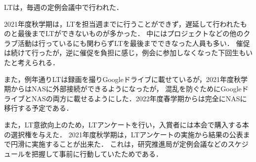 LTは，毎週の定例会議中で行われた．

2021年度秋学期は，LTを担当週までに行うことができず，遅延して行われたものと最後までLTができないものが多かった．
中にはプロジェクトなどの他のクラブ活動は行っているにも関わらずLTを最後までできなった人員も多い．
催促は続けて行ったが，逆に催促を負担に感じ，例会に参加しなくなった下回生もいたと考えられる．

また，例年通りLTは録画を撮りGoogleドライブに載せているが，2021年度秋学期からはNASに外部接続ができるようになったが，
混乱を防ぐためにGoogleドライブとNASの両方に載せるようにした．2022年度春学期からは完全にNASに移行する予定である．

また，LT意欲向上のため，LTアンケートを行い，入賞者には本会で購入する本の選択権を与えた．
2021年度秋学期は，LTアンケートの実施から結果の公表まで円滑に実施することが出来た．
これは，研究推進局が定例会議などのスケジュールを把握して事前に行動していたためである．


